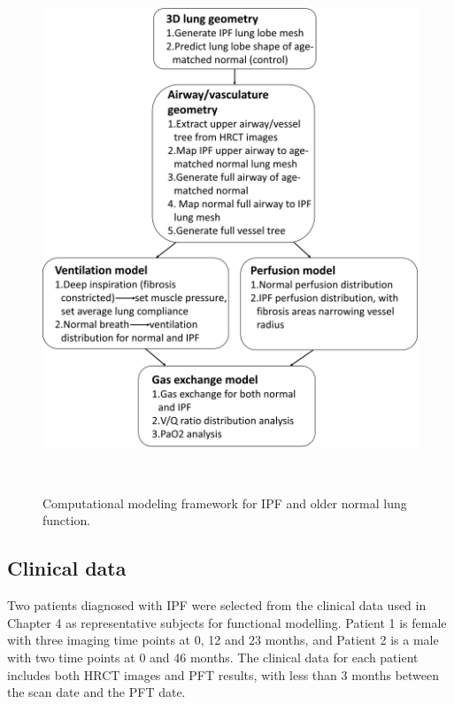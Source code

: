 \begin{figure}[htbp]
  \centering 
  \includegraphics[height=6.2in]{ModelBasedAnalysis/Image/WholeFramework.png}
  \caption{Computational modeling framework for IPF and older normal lung function. }
  \label{fig:WholeFramework}
\end{figure}

\subsection{Clinical data} \label{ClinicalData}
Two patients diagnosed with IPF were selected from the clinical data used in Chapter 4 as representative subjects for functional modelling. Patient 1 is female with three imaging time points at 0, 12 and 23 months, and Patient 2 is a male with two time points at 0 and 46 months. The clinical data for each patient includes both HRCT images and PFT results, with less than 3 months between the scan date and the PFT date. 

